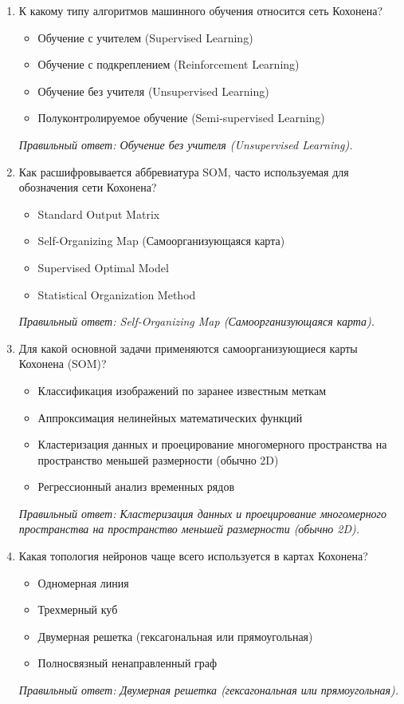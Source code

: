 \small
\begin{enumerate}[label=\textbf{\arabic*.}, leftmargin=0pt, itemsep=1.2em]
\item К какому типу алгоритмов машинного обучения относится сеть Кохонена?
\begin{itemize}[label=$\square$, leftmargin=1.5cm, itemsep=0.2em, topsep=0.3em]
\item Обучение с учителем (Supervised Learning)
\item Обучение с подкреплением (Reinforcement Learning)
\item Обучение без учителя (Unsupervised Learning)
\item Полуконтролируемое обучение (Semi-supervised Learning)
\end{itemize}
{\small\textit{Правильный ответ: Обучение без учителя (Unsupervised Learning).}}

\item Как расшифровывается аббревиатура SOM, часто используемая для обозначения сети Кохонена?
\begin{itemize}[label=$\square$, leftmargin=1.5cm, itemsep=0.2em, topsep=0.3em]
\item Standard Output Matrix
\item Self-Organizing Map (Самоорганизующаяся карта)
\item Supervised Optimal Model
\item Statistical Organization Method
\end{itemize}
{\small\textit{Правильный ответ: Self-Organizing Map (Самоорганизующаяся карта).}}

\item Для какой основной задачи применяются самоорганизующиеся карты Кохонена (SOM)?
\begin{itemize}[label=$\square$, leftmargin=1.5cm, itemsep=0.2em, topsep=0.3em]
\item Классификация изображений по заранее известным меткам
\item Аппроксимация нелинейных математических функций
\item Кластеризация данных и проецирование многомерного пространства на пространство меньшей размерности (обычно 2D)
\item Регрессионный анализ временных рядов
\end{itemize}
{\small\textit{Правильный ответ: Кластеризация данных и проецирование многомерного пространства на пространство меньшей размерности (обычно 2D).}}

\item Какая топология нейронов чаще всего используется в картах Кохонена?
\begin{itemize}[label=$\square$, leftmargin=1.5cm, itemsep=0.2em, topsep=0.3em]
\item Одномерная линия
\item Трехмерный куб
\item Двумерная решетка (гексагональная или прямоугольная)
\item Полносвязный ненаправленный граф
\end{itemize}
{\small\textit{Правильный ответ: Двумерная решетка (гексагональная или прямоугольная).}}


\end{enumerate}
